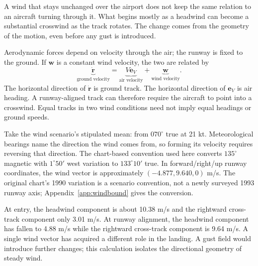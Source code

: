 \label{part:5}
A wind that stays unchanged over the airport does not keep the same relation to an aircraft turning through it. What begins mostly as a headwind can become a substantial crosswind as the track rotates. The change comes from the geometry of the motion, even before any gust is introduced.

Aerodynamic forces depend on velocity through the air; the runway is fixed to the ground. If $\mathbf w$ is a constant wind velocity, the two are related by
\begin{equation}
\underbrace{\dot{\mathbf r}}_{\text{ground velocity}}
=\underbrace{V\mathbf e_V}_{\text{air velocity}}+\underbrace{\mathbf w}_{\text{wind velocity}}.
\label{eq:wind}
\end{equation}
The horizontal direction of $\dot{\mathbf r}$ is ground track. The horizontal direction of $\mathbf e_V$ is air heading. A runway-aligned track can therefore require the aircraft to point into a crosswind. Equal tracks in two wind conditions need not imply equal headings or ground speeds.

Take the wind scenario's stipulated mean: from $070^\circ$ true at 21 kt. Meteorological bearings name the direction the wind comes from, so forming its velocity requires reversing that direction. The chart-based convention used here converts $135^\circ$ magnetic with $1^\circ50'$ west variation to $133^\circ10'$ true. In forward/right/up runway coordinates, the wind vector is approximately $(-4.877,9.640,0)$ m/s. The original chart's 1990 variation is a scenario convention, not a newly surveyed 1993 runway axis; Appendix~\ref{app:windbound} gives the conversion.


At entry, the headwind component is about 10.38 m/s and the rightward cross-track component only 3.01 m/s. At runway alignment, the headwind component has fallen to 4.88 m/s while the rightward cross-track component is 9.64 m/s. A single wind vector has acquired a different role in the landing. A gust field would introduce further changes; this calculation isolates the directional geometry of steady wind.

